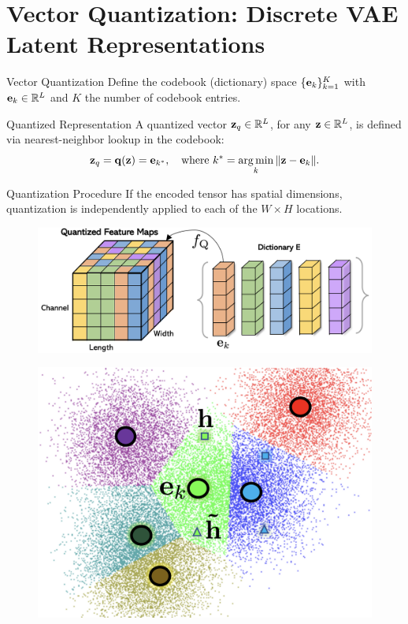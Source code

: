 \documentclass{beamer}
\begin{document}
\section{Vector Quantization: Discrete VAE Latent Representations}
\begin{frame}{Vector Quantization}
	Define the codebook (dictionary) space $\{\mathbf{e}_k\}_{k=1}^K$ with $\mathbf{e}_k \in \mathbb{R}^L$ and $K$ the number of codebook entries.
    \eqpause
	\begin{block}{Quantized Representation}
		A quantized vector $\mathbf{z}_q \in \mathbb{R}^{L}$, for any $\mathbf{z} \in \mathbb{R}^L$, is defined via nearest-neighbor lookup in the codebook:
		\vspace{-0.3cm}
		\[
			\mathbf{z}_q = \mathbf{q} (\mathbf{z}) = \mathbf{e}_{k^*}, \quad \text{where } k^* = \operatorname*{arg\,min}_k \| \mathbf{z} - \mathbf{e}_k \|.
		\] 
        \eqpause
		\vspace{-0.7cm}
	\end{block}
        \eqpause
	\vspace{-0.2cm}
	\begin{block}{Quantization Procedure}
		If the encoded tensor has spatial dimensions, quantization is independently applied to each of the $W \times H$ locations.
		\begin{minipage}[t]{0.65\columnwidth}
			\begin{figure}
				\includegraphics[width=0.8\linewidth]{figs/fqgan_cnn.png}
			\end{figure}
		\end{minipage}%
		\begin{minipage}[t]{0.35\columnwidth}
			\begin{figure}
				\includegraphics[width=0.7\linewidth]{figs/fqgan_lookup}
			\end{figure}
		\end{minipage}
	\end{block}
\end{frame}
\end{document}
